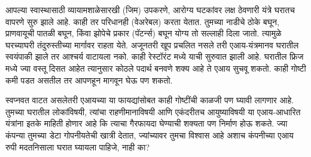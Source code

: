 आपल्या स्वास्थासाठी व्यायामशाळेसारखी (जिम) उपकरणे, आरोग्य घटकांवर लक्ष ठेवणारी यंत्रे घरातच वापरणे सुरु झाले आहे. काही तर परिधानही (वेअरेबल) करता येतात. तुमच्या नाडीचे ठोके बघून, प्राणवायूची पातळी बघून, किंवा झोपेचे प्रकार (पॅटर्न्स) बघून योग्य तो सल्लाही दिला जातो. त्यामुळे घरच्याघरी तंदुरुस्तीच्या मार्गावर राहता येते. अजूनतरी खूप प्रचलित नसले तरी एआय-यंत्रमानव घरातील स्वयंपाकी झाले तर आश्चर्य वाटायला नको. काही रेस्टॉरंट मध्ये याची सुरुवात झाली आहे. घरातील फ्रिज मध्ये ज्या वस्तू दिसत आहेत त्यानुसार कोठले पदार्थ बनवणे शक्य आहे ते एआय सुचवू शकतो. काही गोष्टी कमी पडत असतील तर आपणहून मागवून घेऊ पण शकतो.

स्वप्नवत वाटत असलेतरी एआयच्या या फायद्यांसोबत काही गोष्टींची काळजी पण घ्यावी लागणार आहे. तुमच्या घरातील लोकांविषयी, त्यांचा राहणीमानाविषयी आणि एकंदरीतच आयुष्याविषयी या एआय-आधारित यंत्रांना इतके माहिती होणार आहे कि त्याचा गैरफायदा घेण्याची शक्यता पण निर्माण होऊ शकते. ज्या कंपन्या तुमच्या डेटा गोपनीयतेची खात्री देतात, ज्यांच्यावर तुमचा विश्वास आहे अशाच कंपनीच्या एआय रुपी मदतनिसाला घरात घ्यायला पाहिजे, नाही का?